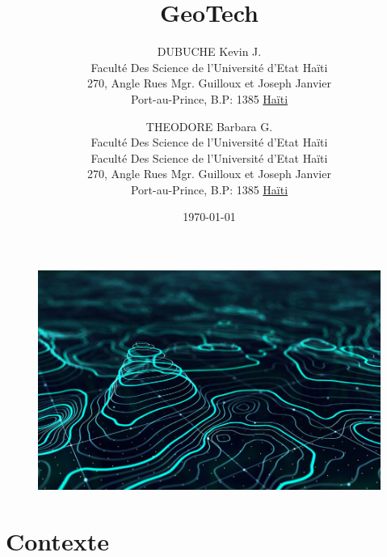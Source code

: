 \documentclass[a4paper,12pt]{report}
\begin{document}
\begin{figure}[t]
        \centering
        \includegraphics[width=1\textwidth]{GIS}
        \label{image-GIS}
        \end{figure}

\title{GeoTech}
\author{
        DUBUCHE Kevin J. \\
        Faculté Des Science de l'Université d'Etat Haïti\\
        270, Angle Rues Mgr. Guilloux et Joseph Janvier\\
        Port-au-Prince, B.P: 1385 \underline{Haïti}
        \and
        THEODORE Barbara G.\\
        Faculté Des Science de l'Université d'Etat Haïti\\
        Faculté Des Science de l'Université d'Etat Haïti\\
        270, Angle Rues Mgr. Guilloux et Joseph Janvier \\
        Port-au-Prince, B.P: 1385  \underline{Haïti}
}
\date{\today}
\maketitle

\tableofcontents
\newpage
{}

\chapter{Contexte}






\end{document}
